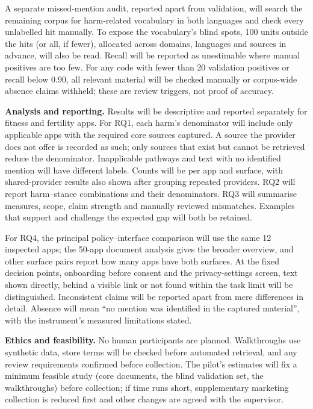 \documentclass[sigconf,nonacm,natbib=false]{acmart}
\begin{document}
A separate missed-mention audit, reported apart from validation, will search
the remaining corpus for harm-related vocabulary in both languages and check
every unlabelled hit manually. To expose the vocabulary's blind spots, 100
units outside the hits (or all, if fewer), allocated across domains, languages
and sources in advance, will also be read. Recall will be reported as
unestimable where manual positives are too few. For any code with fewer than
20 validation positives or recall below 0.90, all relevant material will be
checked manually or corpus-wide absence claims withheld; these are review
triggers, not proof of accuracy.

\textbf{Analysis and reporting.} Results will be descriptive and reported
separately for fitness and fertility apps. For RQ1, each harm's denominator
will include only applicable apps with the required core sources captured. A
source the provider does not offer is recorded as such; only sources that
exist but cannot be retrieved reduce the denominator. Inapplicable pathways
and text with no identified mention will have different labels. Counts will be per app and surface, with
shared-provider results also shown after grouping repeated providers.
RQ2 will report harm--stance combinations and their denominators. RQ3 will
summarise measures, scope, claim strength and manually reviewed mismatches.
Examples that support and challenge the expected gap will both be retained.

For RQ4, the principal policy--interface comparison will use the same 12
inspected apps; the 50-app document analysis gives the broader overview, and
other surface pairs report how many apps have both surfaces. At the fixed
decision points, onboarding before consent and the privacy-settings screen,
text shown directly, behind a visible link or not found within the task limit
will be distinguished. Inconsistent claims will be reported apart from mere
differences in detail. Absence will mean \enquote{no mention was identified
in the captured material}, with the instrument's measured limitations stated.

\textbf{Ethics and feasibility.} No human participants are planned.
Walkthroughs use synthetic data, store terms will be checked before automated
retrieval, and any review requirements confirmed before collection. The
pilot's estimates will fix a minimum feasible study (core documents, the blind
validation set, the walkthroughs) before collection; if time runs short,
supplementary marketing collection is reduced first and other changes are
agreed with the supervisor.
\end{document}
